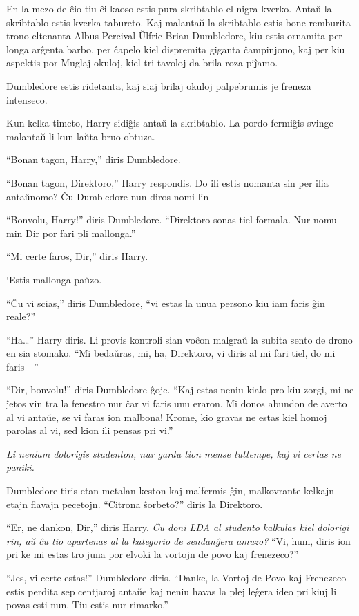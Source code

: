 En la mezo de ĉio tiu ĉi kaoso estis pura skribtablo el nigra
kverko. Antaŭ la skribtablo estis kverka tabureto. Kaj malantaŭ la
skribtablo estis bone remburita trono eltenanta Albus Percival Ŭlfric
Brian Dumbledore, kiu estis ornamita per longa arĝenta barbo, per
ĉapelo kiel dispremita giganta ĉampinjono, kaj per kiu aspektis por
Muglaj okuloj, kiel tri tavoloj da brila roza piĵamo.

Dumbledore estis ridetanta, kaj siaj brilaj okuloj palpebrumis je
freneza intenseco.

Kun kelka timeto, Harry sidiĝis antaŭ la skribtablo. La pordo fermiĝis
svinge malantaŭ li kun laŭta bruo obtuza.

``Bonan tagon, Harry,'' diris Dumbledore.

``Bonan tagon, Direktoro,'' Harry respondis. Do ili estis nomanta sin
per ilia antaŭnomo? Ĉu Dumbledore nun diros nomi lin—

``Bonvolu, Harry!'' diris Dumbledore. ``Direktoro sonas tiel
formala. Nur nomu min Dir por fari pli mallonga.''

``Mi certe faros, Dir,'' diris Harry.

`Estis mallonga paŭzo.

``Ĉu vi scias,'' diris Dumbledore, ``vi estas la unua persono kiu iam
faris ĝin reale?''

``Ha\ldots'' Harry diris. Li provis kontroli sian voĉon malgraŭ la
subita sento de drono en sia stomako. ``Mi bedaŭras, mi, ha,
Direktoro, vi diris al mi fari tiel, do mi faris—''

``Dir, bonvolu!'' diris Dumbledore ĝoje. ``Kaj estas neniu kialo pro
kiu zorgi, mi ne ĵetos vin tra la fenestro nur ĉar vi faris unu
eraron. Mi donos abundon de averto al vi antaŭe, se vi faras ion malbona!
Krome, kio gravas ne estas kiel homoj parolas al vi, sed kion ili
pensas pri vi.''


\emph{Li neniam dolorigis studenton, nur gardu tion mense tuttempe, kaj vi certas ne paniki.}

Dumbledore tiris etan metalan keston kaj malfermis ĝin, malkovrante
kelkajn etajn flavajn pecetojn. ``Citrona ŝorbeto?'' diris la
Direktoro.

``Er, ne dankon, Dir,'' diris Harry. \emph{Ĉu doni LDA al studento
kalkulas kiel dolorigi rin, aŭ ĉu tio apartenas al la kategorio de
sendanĝera amuzo?} ``Vi, hum, diris ion pri ke mi estas tro juna por
elvoki la vortojn de povo kaj frenezeco?''

``Jes, vi certe estas!'' Dumbledore diris. ``Danke, la Vortoj de Povo
kaj Frenezeco estis perdita sep centjaroj antaŭe kaj neniu havas la
plej leĝera ideo pri kiuj li povas esti nun. Tiu estis nur rimarko.''

